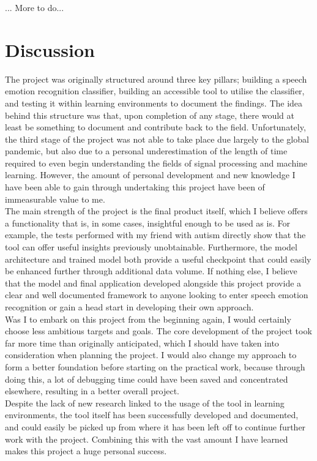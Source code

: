 \documentclass[12pt]{article}
\begin{document}
... More to do...
\newpage
\section{Discussion}
The project was originally structured around three key pillars; building a speech emotion recognition classifier, building an accessible tool to utilise the classifier, and testing it within learning environments to document the findings. The idea behind this structure was that, upon completion of any stage, there would at least be something to document and contribute back to the field. Unfortunately, the third stage of the project was not able to take place due largely to the global pandemic, but also due to a personal underestimation of the length of time required to even begin understanding the fields of signal processing and machine learning. However, the amount of personal development and new knowledge I have been able to gain through undertaking this project have been of immeasurable value to me.
\\

\noindent The main strength of the project is the final product itself, which I believe offers a functionality that is, in some cases, insightful enough to be used as is. For example, the tests performed with my friend with autism directly show that the tool can offer useful insights previously unobtainable. Furthermore, the model architecture and trained model both provide a useful checkpoint that could easily be enhanced further through additional data volume. If nothing else, I believe that the model and final application developed alongside this project provide a clear and well documented framework to anyone looking to enter speech emotion recognition or gain a head start in developing their own approach. 
\\

\noindent Was I to embark on this project from the beginning again, I would certainly choose less ambitious targets and goals. The core development of the project took far more time than originally anticipated, which I should have taken into consideration when planning the project. I would also change my approach to form a better foundation before starting on the practical work, because through doing this, a lot of debugging time could have been saved and concentrated elsewhere, resulting in a better overall project. 
\\

\noindent Despite the lack of new research linked to the usage of the tool in learning environments, the tool itself has been successfully developed and documented, and could easily be picked up from where it has been left off to continue further work with the project. Combining this with the vast amount I have learned makes this project a huge personal success. 
\newpage
\end{document}
